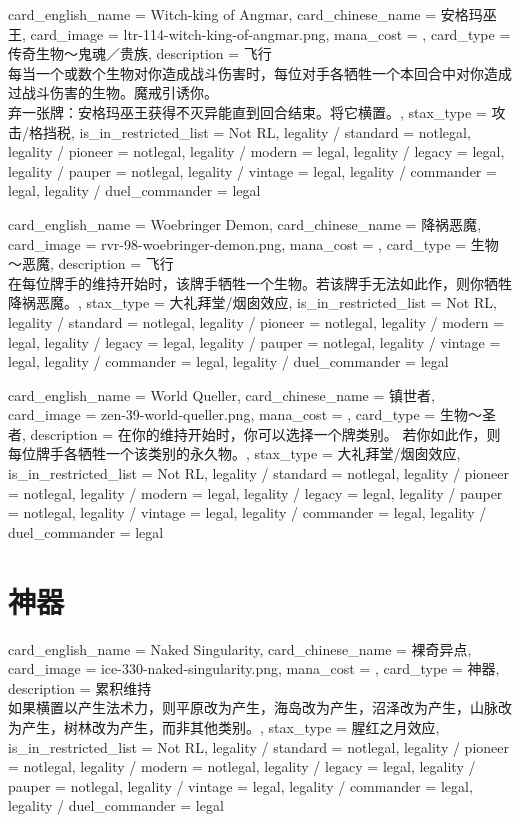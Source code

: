 \documentclass[lang = cn, color = black, 10pt]{AllThatStax}
\begin{document}
\card
{
	card_english_name = {Witch-king of Angmar},
	card_chinese_name = {安格玛巫王},
	card_image = ltr-114-witch-king-of-angmar.png,
	mana_cost = ,
	card_type = 传奇生物～鬼魂／贵族,
	description = {飞行\\
每当一个或数个生物对你造成战斗伤害时，每位对手各牺牲一个本回合中对你造成过战斗伤害的生物。魔戒引诱你。\\
弃一张牌：安格玛巫王获得不灭异能直到回合结束。将它横置。},
	stax_type = 攻击/格挡税,
	is_in_restricted_list = Not RL,
	legality / standard = notlegal,
	legality / pioneer = notlegal,
	legality / modern = legal,
	legality / legacy = legal,
	legality / pauper = notlegal,
	legality / vintage = legal,
	legality / commander = legal,
	legality / duel_commander = legal
}

\card
{
	card_english_name = {Woebringer Demon},
	card_chinese_name = {降祸恶魔},
	card_image = rvr-98-woebringer-demon.png,
	mana_cost = ,
	card_type = 生物～恶魔,
	description = {飞行\\
在每位牌手的维持开始时，该牌手牺牲一个生物。若该牌手无法如此作，则你牺牲降祸恶魔。},
	stax_type = 大礼拜堂/烟囱效应,
	is_in_restricted_list = Not RL,
	legality / standard = notlegal,
	legality / pioneer = notlegal,
	legality / modern = legal,
	legality / legacy = legal,
	legality / pauper = notlegal,
	legality / vintage = legal,
	legality / commander = legal,
	legality / duel_commander = legal
}

\card
{
	card_english_name = {World Queller},
	card_chinese_name = {镇世者},
	card_image = zen-39-world-queller.png,
	mana_cost = ,
	card_type = 生物～圣者,
	description = {在你的维持开始时，你可以选择一个牌类别。 若你如此作，则每位牌手各牺牲一个该类别的永久物。},
	stax_type = 大礼拜堂/烟囱效应,
	is_in_restricted_list = Not RL,
	legality / standard = notlegal,
	legality / pioneer = notlegal,
	legality / modern = legal,
	legality / legacy = legal,
	legality / pauper = notlegal,
	legality / vintage = legal,
	legality / commander = legal,
	legality / duel_commander = legal
}

\section{神器}

\card
{
	card_english_name = {Naked Singularity},
	card_chinese_name = {裸奇异点},
	card_image = ice-330-naked-singularity.png,
	mana_cost = ,
	card_type = 神器,
	description = {累积维持\\
如果横置以产生法术力，则平原改为产生，海岛改为产生，沼泽改为产生，山脉改为产生，树林改为产生，而非其他类别。},
	stax_type = 腥红之月效应,
	is_in_restricted_list = Not RL,
	legality / standard = notlegal,
	legality / pioneer = notlegal,
	legality / modern = notlegal,
	legality / legacy = legal,
	legality / pauper = notlegal,
	legality / vintage = legal,
	legality / commander = legal,
	legality / duel_commander = legal
}
\end{document}
